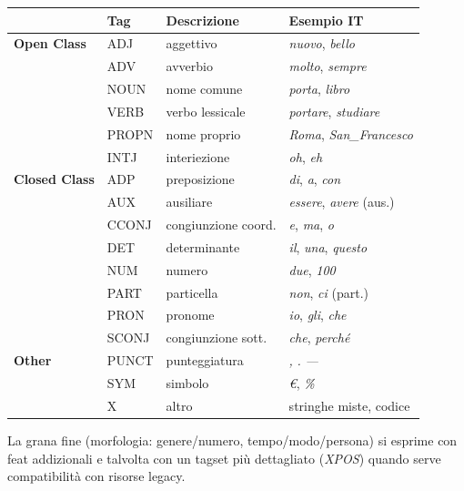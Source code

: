         \begin{center}
            \begin{tabular}{llll}
            \toprule
            & \textbf{Tag} & \textbf{Descrizione} & \textbf{Esempio IT} \\
            \midrule
            \textbf{Open Class} & ADJ & aggettivo & \emph{nuovo}, \emph{bello} \\
            & ADV & avverbio & \emph{molto}, \emph{sempre} \\
            & NOUN & nome comune & \emph{porta}, \emph{libro} \\
            & VERB & verbo lessicale & \emph{portare}, \emph{studiare} \\
            & PROPN & nome proprio & \emph{Roma}, \emph{San\_Francesco} \\
            & INTJ & interiezione & \emph{oh}, \emph{eh} \\
            \midrule
            \textbf{Closed Class} & ADP & preposizione & \emph{di}, \emph{a}, \emph{con} \\
            & AUX & ausiliare & \emph{essere}, \emph{avere} (aus.) \\
            & CCONJ & congiunzione coord. & \emph{e}, \emph{ma}, \emph{o} \\
            & DET & determinante & \emph{il}, \emph{una}, \emph{questo} \\
            & NUM & numero & \emph{due}, \emph{100} \\
            & PART & particella & \emph{non}, \emph{ci} (part.) \\
            & PRON & pronome & \emph{io}, \emph{gli}, \emph{che} \\
            & SCONJ & congiunzione sott. & \emph{che}, \emph{perché} \\
            \midrule
            \textbf{Other} & PUNCT & punteggiatura & \emph{,} \emph{.} \emph{—} \\
            & SYM & simbolo & \emph{€}, \emph{\%} \\
            & X & altro & stringhe miste, codice \\
            \bottomrule
            \end{tabular}
        \end{center}

        La grana fine (morfologia: genere/numero, tempo/modo/persona) si esprime con feat addizionali e talvolta con un tagset più dettagliato (\emph{XPOS}) quando serve compatibilità con risorse legacy.\\
        

